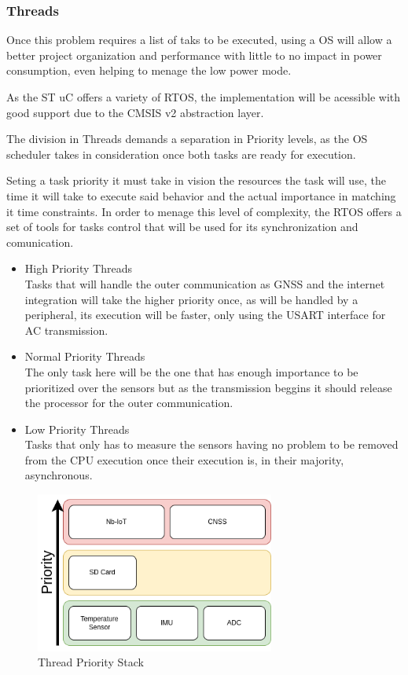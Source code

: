 \subsubsection{Threads} 
Once this problem requires a list of taks to be executed, using a OS will allow
a better project organization and performance with little to no impact in power consumption, even helping to menage the low power mode.

As the ST uC offers a variety of RTOS, the implementation will be acessible with good support due to the
CMSIS v2 abstraction layer.

The division in Threads demands a separation in Priority levels, as the OS scheduler takes in consideration 
once both tasks are ready for execution.  

Seting a task priority it must take in vision the resources the task will use, the time it will take to execute said behavior
and the actual importance in matching it time constraints. In order to menage this level of complexity, the RTOS offers a set of
tools for tasks control that will be used for its synchronization and comunication.
\begin{itemize}
    \item High Priority Threads \\ 
    Tasks that will handle the outer communication as GNSS and the internet integration will take the higher priority once, as will be handled
    by a peripheral, its execution will be faster, only using the USART interface for AC transmission. 
    \item Normal Priority Threads \\
    The only task here will be the one that has enough importance to be prioritized over the sensors but as the transmission beggins it should release the processor
    for the outer communication.
    \item Low Priority Threads \\
    Tasks that only has to measure the sensors having no problem to be removed from the CPU execution
    once their execution is, in their majority, asynchronous.
    
\end{itemize}

\begin{figure}[H]
    \centering
    \includegraphics[width=0.7\textwidth]{images/diagrams/threads/thread.drawio.png}  %
    \caption{Thread Priority Stack}
    \label{fig:Thread Priority Stack}        
\end{figure}

